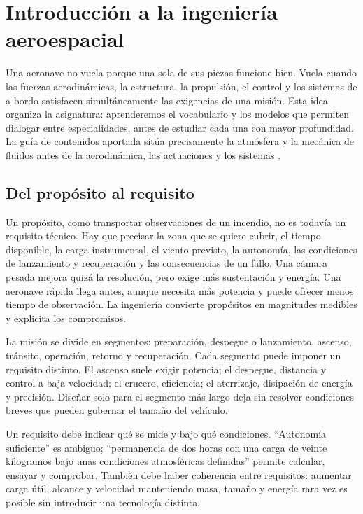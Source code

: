 \chapter{Introducción a la ingeniería aeroespacial}\label{ch:01}

Una aeronave no vuela porque una sola de sus piezas funcione bien. Vuela cuando las fuerzas aerodinámicas, la estructura, la propulsión, el control y los sistemas de a bordo satisfacen simultáneamente las exigencias de una misión. Esta idea organiza la asignatura: aprenderemos el vocabulario y los modelos que permiten dialogar entre especialidades, antes de estudiar cada una con mayor profundidad. La guía de contenidos aportada sitúa precisamente la atmósfera y la mecánica de fluidos antes de la aerodinámica, las actuaciones y los sistemas \cite{TAE0}.

\section{Del propósito al requisito}
Un propósito, como transportar observaciones de un incendio, no es todavía un requisito técnico. Hay que precisar la zona que se quiere cubrir, el tiempo disponible, la carga instrumental, el viento previsto, la autonomía, las condiciones de lanzamiento y recuperación y las consecuencias de un fallo. Una cámara pesada mejora quizá la resolución, pero exige más sustentación y energía. Una aeronave rápida llega antes, aunque necesita más potencia y puede ofrecer menos tiempo de observación. La ingeniería convierte propósitos en magnitudes medibles y explicita los compromisos.

La misión se divide en segmentos: preparación, despegue o lanzamiento, ascenso, tránsito, operación, retorno y recuperación. Cada segmento puede imponer un requisito distinto. El ascenso suele exigir potencia; el despegue, distancia y control a baja velocidad; el crucero, eficiencia; el aterrizaje, disipación de energía y precisión. Diseñar solo para el segmento más largo deja sin resolver condiciones breves que pueden gobernar el tamaño del vehículo.

Un requisito debe indicar qué se mide y bajo qué condiciones. ``Autonomía suficiente'' es ambiguo; ``permanencia de dos horas con una carga de veinte kilogramos bajo unas condiciones atmosféricas definidas'' permite calcular, ensayar y comprobar. También debe haber coherencia entre requisitos: aumentar carga útil, alcance y velocidad manteniendo masa, tamaño y energía rara vez es posible sin introducir una tecnología distinta.

